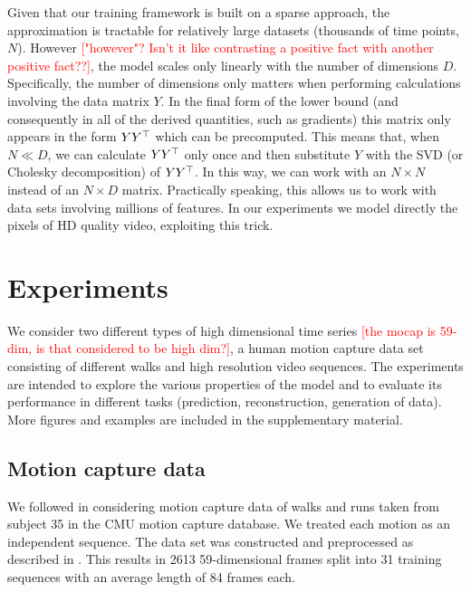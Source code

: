 \documentclass{article} %
\begin{document}
Given that our training framework is built on a sparse approach, the
approximation is tractable for relatively large datasets (thousands of
time points, $N$). However \textcolor{red}{["however"? Isn't it like contrasting a positive fact with another positive fact??]},
 the model scales only
linearly with the number of dimensions $D$. Specifically, the number
of dimensions only matters when performing calculations involving the
data matrix $Y$. In the final form of the lower bound (and
consequently in all of the derived quantities, such as gradients) this
matrix only appears in the form $Y Y^{\top}$ which can be precomputed. This
means that, when $N \ll D$, we can calculate $Y Y^{\top}$ only once and
then substitute $Y$ with the SVD (or Cholesky decomposition) of $Y
Y^{\top}$. In this way, we can work with an $N \times N$ instead of an $N
\times D$ matrix. Practically speaking, this allows us to work with data sets involving millions of features. In our experiments we model directly the pixels of HD quality video, exploiting this trick.


\section{Experiments}

We consider two different types of high dimensional time series \textcolor{red}{[the mocap is 59-dim, is that considered to be high dim?]}, a human motion capture data set consisting of different walks and high resolution video sequences. The experiments are intended to explore the various properties of the model and to evaluate its performance in different tasks (prediction, reconstruction, generation of data). More figures and examples are included in the supplementary material.

\subsection{Motion capture data}

We followed \cite{Taylor,gplvmLarger} in considering motion capture
data of walks and runs taken from subject 35 in the CMU motion capture
database. We treated each motion as an independent sequence.  The data
set was constructed and preprocessed as described in
\cite{gplvmLarger}. This results in 2613 59-dimensional frames split
into 31 training sequences with an average length of 84 frames each.
\end{document}
